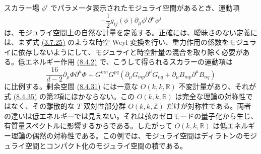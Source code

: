 スカラー場 $\phi^i$ でパラメータ表示されたモジュライ空間があるとき、運動項
\begin{equation}
-\frac12g_{ij}(\phi)\partial_\mu\phi^i\partial^\mu\phi^j
\tag{8.4.34}\label{eq:8.4.34}
\end{equation}
は、モジュライ空間上の自然な計量を定義する。正確には、曖昧さのない定義には、まず式 \hyperref[eq:3.7.25]{(3.7.25)} のような時空 Weyl 変換を行い、重力作用の係数をモジュライに依存しないようにして、モジュライと時空計量の混合を取り除く必要がある。低エネルギー作用 \hyperref[eq:8.4.2]{(8.4.2)} で、こうして得られるスカラーの運動項は
\begin{equation}
\frac{16}{d-2}\partial_\mu\Phi\partial^\mu\Phi
+G^{mn}G^{pq}(\partial_\mu G_{mp}\partial^\mu G_{nq}+\partial_\mu B_{mp}\partial^\mu B_{nq})
\tag{8.4.35}\label{eq:8.4.35}
\end{equation}
に比例する。剰余空間 \hyperref[eq:8.4.31]{(8.4.31)} には一意な $O(k,k,\mathbb R)$ 不変計量があり、それが式 \hyperref[eq:8.4.35]{(8.4.35)} の第2項にほかならない。この $O(k,k,\mathbb R)$ は完全な理論の対称性ではなく、その離散的な $T$ 双対性部分群 $O(k,k,\mathbb Z)$ だけが対称性である。両者の違いは低エネルギーでは見えない。それは弦のゼロモードの量子化から生じ、有質量スペクトルに影響するからである。したがって $O(k,k,\mathbb R)$ は低エネルギー理論の偶然の対称性である。この例では、モジュライ空間はディラトンのモジュライ空間とコンパクト化のモジュライ空間の積である。


